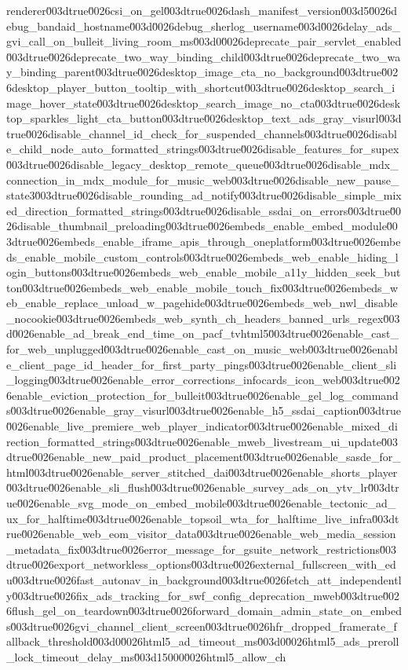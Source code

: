 {renderer\u003dtrue\u0026csi_on_gel\u003dtrue\u0026dash_manifest_version\u003d5\u0026debug_bandaid_hostname\u003d\u0026debug_sherlog_username\u003d\u0026delay_ads_gvi_call_on_bulleit_living_room_ms\u003d0\u0026deprecate_pair_servlet_enabled\u003dtrue\u0026deprecate_two_way_binding_child\u003dtrue\u0026deprecate_two_way_binding_parent\u003dtrue\u0026desktop_image_cta_no_background\u003dtrue\u0026desktop_player_button_tooltip_with_shortcut\u003dtrue\u0026desktop_search_image_hover_state\u003dtrue\u0026desktop_search_image_no_cta\u003dtrue\u0026desktop_sparkles_light_cta_button\u003dtrue\u0026desktop_text_ads_gray_visurl\u003dtrue\u0026disable_channel_id_check_for_suspended_channels\u003dtrue\u0026disable_child_node_auto_formatted_strings\u003dtrue\u0026disable_features_for_supex\u003dtrue\u0026disable_legacy_desktop_remote_queue\u003dtrue\u0026disable_mdx_connection_in_mdx_module_for_music_web\u003dtrue\u0026disable_new_pause_state3\u003dtrue\u0026disable_rounding_ad_notify\u003dtrue\u0026disable_simple_mixed_direction_formatted_strings\u003dtrue\u0026disable_ssdai_on_errors\u003dtrue\u0026disable_thumbnail_preloading\u003dtrue\u0026embeds_enable_embed_module\u003dtrue\u0026embeds_enable_iframe_apis_through_oneplatform\u003dtrue\u0026embeds_enable_mobile_custom_controls\u003dtrue\u0026embeds_web_enable_hiding_login_buttons\u003dtrue\u0026embeds_web_enable_mobile_a11y_hidden_seek_button\u003dtrue\u0026embeds_web_enable_mobile_touch_fix\u003dtrue\u0026embeds_web_enable_replace_unload_w_pagehide\u003dtrue\u0026embeds_web_nwl_disable_nocookie\u003dtrue\u0026embeds_web_synth_ch_headers_banned_urls_regex\u003d\u0026enable_ad_break_end_time_on_pacf_tvhtml5\u003dtrue\u0026enable_cast_for_web_unplugged\u003dtrue\u0026enable_cast_on_music_web\u003dtrue\u0026enable_client_page_id_header_for_first_party_pings\u003dtrue\u0026enable_client_sli_logging\u003dtrue\u0026enable_error_corrections_infocards_icon_web\u003dtrue\u0026enable_eviction_protection_for_bulleit\u003dtrue\u0026enable_gel_log_commands\u003dtrue\u0026enable_gray_visurl\u003dtrue\u0026enable_h5_ssdai_caption\u003dtrue\u0026enable_live_premiere_web_player_indicator\u003dtrue\u0026enable_mixed_direction_formatted_strings\u003dtrue\u0026enable_mweb_livestream_ui_update\u003dtrue\u0026enable_new_paid_product_placement\u003dtrue\u0026enable_sasde_for_html\u003dtrue\u0026enable_server_stitched_dai\u003dtrue\u0026enable_shorts_player\u003dtrue\u0026enable_sli_flush\u003dtrue\u0026enable_survey_ads_on_ytv_lr\u003dtrue\u0026enable_svg_mode_on_embed_mobile\u003dtrue\u0026enable_tectonic_ad_ux_for_halftime\u003dtrue\u0026enable_topsoil_wta_for_halftime_live_infra\u003dtrue\u0026enable_web_eom_visitor_data\u003dtrue\u0026enable_web_media_session_metadata_fix\u003dtrue\u0026error_message_for_gsuite_network_restrictions\u003dtrue\u0026export_networkless_options\u003dtrue\u0026external_fullscreen_with_edu\u003dtrue\u0026fast_autonav_in_background\u003dtrue\u0026fetch_att_independently\u003dtrue\u0026fix_ads_tracking_for_swf_config_deprecation_mweb\u003dtrue\u0026flush_gel_on_teardown\u003dtrue\u0026forward_domain_admin_state_on_embeds\u003dtrue\u0026gvi_channel_client_screen\u003dtrue\u0026hfr_dropped_framerate_fallback_threshold\u003d0\u0026html5_ad_timeout_ms\u003d0\u0026html5_ads_preroll_lock_timeout_delay_ms\u003d15000\u0026html5_allow_ch}
